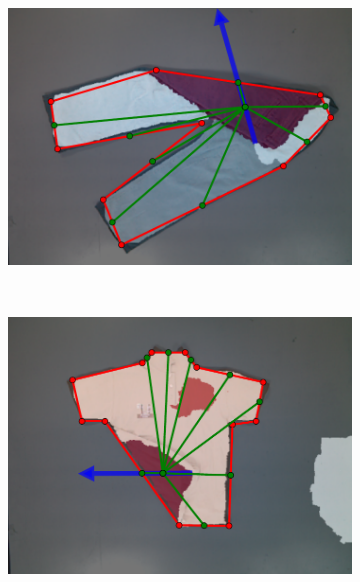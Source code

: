 \begin{figure}[htbp]
	\centering
	\begin{subfigure}[l]{\bigtablewidth}
	    \centering
    	\includegraphics[width=\textwidth]
    	{figures/results/pants7-pnp.pdf}
	\end{subfigure}
	~
	\begin{subfigure}[r]{\bigtablewidth}
	    \centering
    	\includegraphics[width=\textwidth]
    	{figures/results/polo1-pnp.pdf}
	\end{subfigure}
	~
    \begin{subfigure}[l]{\bigtablewidth}
	    \centering

\end{subfigure}
\end{figure}

